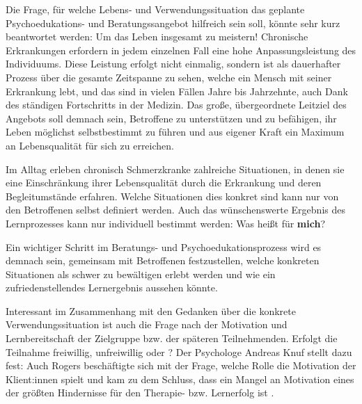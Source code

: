 \documentclass[
  twoside,
  parskip=half-,
  paper=176mm:246mm,
  BCOR=14mm,
  DIV=14,
]{scrreprt}
\begin{document}
\begin{praxis}
  Die Frage, für welche Lebens- und Verwendungssituation das geplante Psychoedukations- und Beratungssangebot hilfreich sein soll, könnte sehr kurz beantwortet werden: Um das Leben insgesamt zu  meistern! Chronische Erkrankungen erfordern in jedem einzelnen Fall eine hohe Anpassungsleistung des Individuums. Diese Leistung erfolgt nicht einmalig, sondern ist als dauerhafter Prozess über die gesamte Zeitspanne zu sehen, welche ein Mensch mit seiner Erkrankung lebt, und das sind in vielen Fällen Jahre bis Jahrzehnte, auch Dank des ständigen Fortschritts in der Medizin. Das große, übergeordnete Leitziel des Angebots soll demnach sein, Betroffene zu unterstützen und zu befähigen, ihr Leben möglichst selbstbestimmt zu führen und aus eigener Kraft ein Maximum an Lebensqualität für sich zu erreichen. 

  Im Alltag erleben chronisch Schmerzkranke zahlreiche Situationen, in denen sie eine Einschränkung ihrer Lebensqualität durch die Erkrankung und deren Begleitumstände erfahren. Welche Situationen dies konkret sind kann nur von den Betroffenen selbst definiert werden. Auch das wünschenswerte Ergebnis des Lernprozesses kann nur individuell bestimmt werden: Was heißt  für \textbf{mich}? 

  Ein wichtiger Schritt im Beratungs- und Psychoedukationsprozess wird es demnach sein, gemeinsam mit Betroffenen festzustellen, welche konkreten Situationen als schwer zu bewältigen erlebt werden und wie ein zufriedenstellendes Lernergebnis aussehen könnte.
\end{praxis}

Interessant im Zusammenhang mit den Gedanken über die konkrete Verwendungssituation ist auch die Frage nach der Motivation und Lernbereitschaft der Zielgruppe bzw. der späteren Teilnehmenden. Erfolgt die Teilnahme freiwillig, unfreiwillig oder ? Der Psychologe Andreas Knuf stellt dazu fest:  Auch Rogers beschäftigte sich mit der Frage, welche Rolle die Motivation der Klient:innen spielt und kam zu dem Schluss, dass ein Mangel an Motivation eines der größten Hindernisse für den Therapie- bzw. Lernerfolg ist \autocite[vgl.][196]{rogers1977}.
\end{document}
